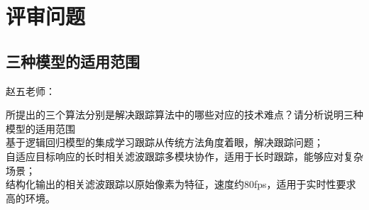 \section{评审问题}

\subsection{三种模型的适用范围}

\begin{frame}{赵五老师：}

    \begin{block}{所提出的三个算法分别是解决跟踪算法中的哪些对应的技术难点？请分析说明三种模型的适用范围}
        ~\\
        基于逻辑回归模型的集成学习跟踪从传统方法角度着眼，解决跟踪问题；\\
        自适应目标响应的长时相关滤波跟踪多模块协作，适用于长时跟踪，能够应对复杂场景；\\
        结构化输出的相关滤波跟踪以原始像素为特征，速度约80fps，适用于实时性要求高的环境。
    \end{block}

\end{frame}

